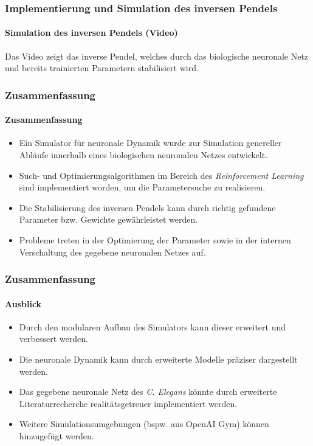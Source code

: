 \documentclass[10pt,t,aspectratio=1610]{beamer}
\newcommand{\ChapterCartpole}{Implementierung und Simulation des inversen Pendels}
\newcommand{\ChapterEnd}{Zusammenfassung}
\begin{document}

\begin{frame}
	\frametitle{\ChapterCartpole}
	\framesubtitle{Simulation des inversen Pendels (Video)}
	\vspace{0.3cm}
	Das Video zeigt das inverse Pendel, welches durch das biologische neuronale Netz und bereits trainierten Parametern stabilisiert wird.\\
	\vspace{0.3cm}
		\centering

\end{frame}


\begin{frame}
	\frametitle{\ChapterEnd}
	\framesubtitle{Zusammenfassung}
	\vspace{0.3cm}
	\begin{itemize}
		\item Ein Simulator für neuronale Dynamik wurde zur Simulation genereller Abläufe innerhalb eines biologischen neuronalen Netzes entwickelt. 
		\item Such- und Optimierungsalgorithmen im Bereich des \textit{Reinforcement Learning} sind implementiert worden, um die Parametersuche zu realisieren.
		\item Die Stabilisierung des inversen Pendels kann durch richtig gefundene Parameter bzw. Gewichte gewährleistet werden.
		\item Probleme treten in der Optimierung der Parameter sowie in der internen Verschaltung des gegebene neuronalen Netzes auf.
	\end{itemize}

\end{frame}


\begin{frame}
\frametitle{\ChapterEnd}
\framesubtitle{Ausblick}
	\vspace{0.3cm}
	\begin{itemize}
		\item Durch den modularen Aufbau des Simulators kann dieser erweitert und verbessert werden.
		\item Die neuronale Dynamik kann durch erweiterte Modelle präziser dargestellt werden.
		\item Das gegebene neuronale Netz des \textit{C. Elegans} könnte durch erweiterte Literaturrecherche realitätsgetreuer implementiert werden.
		\item Weitere Simulationsumgebungen (bspw. aus OpenAI Gym) können hinzugefügt werden.
	\end{itemize}
\end{frame}
\end{document}
